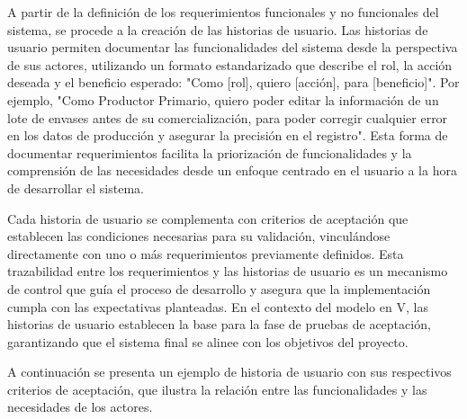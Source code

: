A partir de la definición de los requerimientos funcionales y no funcionales del sistema, se procede a la creación de las historias de usuario. Las historias de usuario permiten documentar las funcionalidades del sistema desde la perspectiva de sus actores, utilizando un formato estandarizado que describe el rol, la acción deseada y el beneficio esperado: "Como [rol], quiero [acción], para [beneficio]". Por ejemplo, "Como Productor Primario,  
quiero poder editar la información de un lote de envases antes de su comercialización, para poder corregir cualquier error en los datos de producción y asegurar la precisión en el registro". Esta forma de documentar requerimientos facilita la priorización de funcionalidades y la comprensión de las necesidades desde un enfoque centrado en el usuario a la hora de desarrollar el sistema.

Cada historia de usuario se complementa con criterios de aceptación que establecen las condiciones necesarias para su validación, vinculándose directamente con uno o más requerimientos previamente definidos. Esta trazabilidad entre los requerimientos y las historias de usuario es un mecanismo de control que guía el proceso de desarrollo y asegura que la implementación cumpla con las expectativas planteadas. En el contexto del modelo en V, las historias de usuario establecen la base para la fase de pruebas de aceptación, garantizando que el sistema final se alinee con los objetivos del proyecto.

A continuación se presenta un ejemplo de historia de usuario con sus respectivos criterios de aceptación, que ilustra la relación entre las funcionalidades y las necesidades de los actores.

